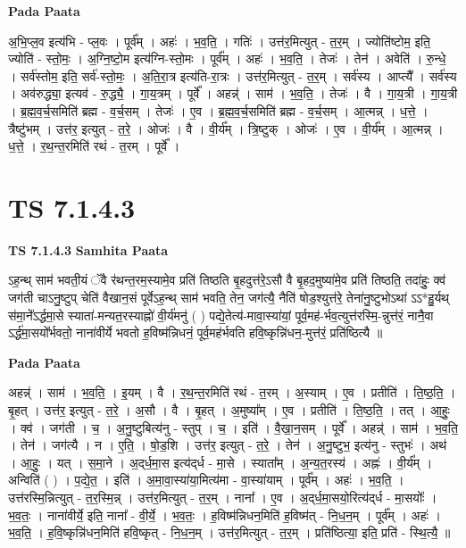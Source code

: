 \documentclass[17pt]{extarticle}
\begin{document}
\textbf{Pada Paata} \newline

अ॒भि॒प्ल॒व इत्य॑भि - प्ल॒वः । पूर्व᳚म् । अहः॑ । भ॒व॒ति॒ । गतिः॑ । उत्त॑र॒मित्युत् - त॒र॒म् । ज्योति॑ष्टोम॒ इति॒ ज्योति॑ - स्तो॒मः॒ । अ॒ग्नि॒ष्टो॒म इत्य॑ग्नि-स्तो॒मः । पूर्व᳚म् । अहः॑ । भ॒व॒ति॒ । तेजः॑ । तेन॑ । अवेति॑ । रु॒न्धे॒ । सर्व॑स्तोम॒ इति॒ सर्व॑-स्तो॒मः॒ । अ॒ति॒रा॒त्र इत्य॑ति-रा॒त्रः । उत्त॑र॒मित्युत् - त॒र॒म् । सर्व॑स्य । आप्त्यै᳚ । सर्व॑स्य । अव॑रुद्ध्या॒ इत्यव॑ - रु॒द्ध्यै॒ । गा॒य॒त्रम् । पूर्वे᳚ । अहन्न्॑ । साम॑ । भ॒व॒ति॒ । तेजः॑ । वै । गा॒य॒त्री । गा॒य॒त्री । ब्र॒ह्म॒व॒र्च॒समिति॑ ब्रह्म - व॒र्च॒सम् । तेजः॑ । ए॒व । ब्र॒ह्म॒व॒र्च॒समिति॑ ब्रह्म - व॒र्च॒सम् । आ॒त्मन्न् । ध॒त्ते॒ । त्रैष्टु॑भम् । उत्त॑र॒ इत्युत् - त॒रे॒ । ओजः॑ । वै । वी॒र्य᳚म् । त्रि॒ष्टुक् । ओजः॑ । ए॒व । वी॒र्य᳚म् । आ॒त्मन्न् । ध॒त्ते॒ । र॒थ॒न्त॒रमिति॑ रथं - त॒रम् । पूर्वे᳚ ।  \newline





\section{ TS 7.1.4.3 }

\textbf{TS 7.1.4.3 } \newline
\textbf{Samhita Paata} \newline

ऽह॒न्थ् साम॑ भवती॒यं ॅवै र॑थन्त॒रम॒स्यामे॒व प्रति॑ तिष्ठति बृ॒हदुत्त॑रे॒ऽसौ वै बृ॒हद॒मुष्या॑मे॒व प्रति॑ तिष्ठति॒ तदा॑हुः॒ क्व॑ जग॑ती चाऽनु॒ष्टुप् चेति॑ वैखान॒सं पूर्वेऽह॒न्थ् साम॑ भवति॒ तेन॒ जग॑त्यै॒ नैति॑ षोड॒श्युत्त॑रे॒ तेना॑नु॒ष्टुभोऽथा॑ ऽऽ*हु॒र्यथ् स॑मा॒ने᳚ऽर्द्धमा॒से स्याता॑-मन्यत॒रस्याह्नो॑ वी॒र्य॑मनु॑ ( ) पद्ये॒तेत्य॑-मावा॒स्या॑यां॒ पूर्व॒मह॑-र्भव॒त्युत्त॑रस्मि॒-न्नुत्त॑रं॒ नानै॒वा ऽर्द्ध॑मा॒सयो᳚र्भवतो॒ नाना॑वीर्ये भवतो ह॒विष्म॑न्निधनं॒ पूर्व॒मह॑र्भवति हवि॒ष्कृन्नि॑धन॒-मुत्त॑रं॒ प्रति॑ष्ठित्यै ॥ \newline

\textbf{Pada Paata} \newline

अहन्न्॑ । साम॑ । भ॒व॒ति॒ । इ॒यम् । वै । र॒थ॒न्त॒रमिति॑ रथं - त॒रम् । अ॒स्याम् । ए॒व । प्रतीति॑ । ति॒ष्ठ॒ति॒ । बृ॒हत् । उत्त॑र॒ इत्युत् - त॒रे॒ । अ॒सौ । वै । बृ॒हत् । अ॒मुष्या᳚म् । ए॒व । प्रतीति॑ । ति॒ष्ठ॒ति॒ । तत् । आ॒हुः॒ । क्व॑ । जग॑ती । च॒ । अ॒नु॒ष्टुबित्य॑नु - स्तुप् । च॒ । इति॑ । वै॒खा॒न॒सम् । पूर्वे᳚ । अहन्न्॑ । साम॑ । भ॒व॒ति॒ । तेन॑ । जग॑त्यै । न । ए॒ति॒ । षो॒ड॒शि । उत्त॑र॒ इत्युत् - त॒रे॒ । तेन॑ । अ॒नु॒ष्टुभ॒ इत्य॑नु - स्तुभः॑ । अथ॑ । आ॒हुः॒ । यत् । स॒मा॒ने । अ॒द्‌र्ध॒मा॒स इत्य॑द्‌र्ध - मा॒से । स्याता᳚म् । अ॒न्य॒त॒रस्य॑ । अह्नः॑ । वी॒र्य᳚म् । अन्विति॑ ( ) । प॒द्ये॒त॒ । इति॑ । अ॒मा॒वा॒स्या॑या॒मित्य॑मा - वा॒स्या॑याम् । पूर्व᳚म् । अहः॑ । भ॒व॒ति॒ । उत्त॑रस्मि॒न्नित्युत् - त॒र॒स्मि॒न्न् । उत्त॑र॒मित्युत् - त॒र॒म् । नाना᳚ । ए॒व । अ॒द्‌र्ध॒मा॒सयो॒रित्य॑द्‌र्ध - मा॒सयोः᳚ । भ॒व॒तः॒ । नाना॑वीर्ये॒ इति॒ नाना᳚ - वी॒र्ये॒ । भ॒व॒तः॒ । ह॒विष्म॑न्निधन॒मिति॑ ह॒विष्म॑त् - नि॒ध॒न॒म् । पूर्व᳚म् । अहः॑ । भ॒व॒ति॒ । ह॒वि॒ष्कृन्नि॑धन॒मिति॑ हवि॒ष्कृत् - नि॒ध॒न॒म् । उत्त॑र॒मित्युत् - त॒र॒म् । प्रति॑ष्ठित्या॒ इति॒ प्रति॑ - स्थि॒त्यै॒ ॥  \newline
\end{document}
